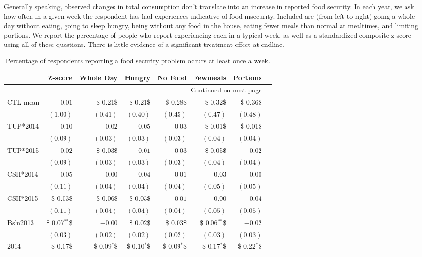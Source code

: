 \documentclass[12pt,article]{article}
\begin{document}
Generally speaking, observed changes in total consumption don't translate into an
increase in reported food security. In each year, we ask how often in a given week
the respondent has had experiences indicative of food insecurity. Included are (from
left to right) going a whole day without eating, going to sleep hungry, being without
any food in the house, eating fewer meals than normal at mealtimes, and limiting
portions. We report the percentage of people who report experiencing each in a
typical week, as well as a standardized composite z-score using all of these
questions. There is little evidence of a significant treatment effect at endline.

\begin{longtable}{lrrrrrrr}
\caption{\label{tab:foodsecure}Percentage of respondents reporting a food security problem occurs at least once a week.}
\\
\hline
 & Z-score & Whole Day & Hungry & No Food & Fewmeals & Portions\\
\hline
\endhead
\hline\multicolumn{7}{r}{Continued on next page} \\
\endfoot
\endlastfoot
CTL mean & $-0.01$ & \$ 0.21\$ & \$ 0.21\$ & \$ 0.28\$ & \$ 0.32\$ & \$ 0.36\$\\
 & $( 1.00)$ & $( 0.41)$ & $( 0.40)$ & $( 0.45)$ & $( 0.47)$ & $( 0.48)$\\
\hline
TUP*2014 & $-0.10$ & $-0.02$ & $-0.05$ & $-0.03$ & \$ 0.01\$ & \$ 0.01\$\\
 & $( 0.09)$ & $( 0.03)$ & $( 0.03)$ & $( 0.03)$ & $( 0.04)$ & $( 0.04)$\\
TUP*2015 & $-0.02$ & \$ 0.03\$ & $-0.01$ & $-0.03$ & \$ 0.05\$ & $-0.02$\\
 & $( 0.09)$ & $( 0.03)$ & $( 0.03)$ & $( 0.03)$ & $( 0.04)$ & $( 0.04)$\\
CSH*2014 & $-0.05$ & $-0.00$ & $-0.04$ & $-0.01$ & $-0.03$ & $-0.00$\\
 & $( 0.11)$ & $( 0.04)$ & $( 0.04)$ & $( 0.04)$ & $( 0.05)$ & $( 0.05)$\\
CSH*2015 & \$ 0.03\$ & \$ 0.06\$ & \$ 0.03\$ & $-0.01$ & $-0.00$ & $-0.04$\\
 & $( 0.11)$ & $( 0.04)$ & $( 0.04)$ & $( 0.04)$ & $( 0.05)$ & $( 0.05)$\\
Bsln2013 & \$ 0.07$^{\text{**}}$\$ & $-0.00$ & \$ 0.02\$ & \$ 0.03\$ & \$ 0.06$^{\text{**}}$\$ & $-0.02$\\
 & $( 0.03)$ & $( 0.02)$ & $( 0.02)$ & $( 0.02)$ & $( 0.03)$ & $( 0.03)$\\
2014 & \$ 0.07\$ & \$ 0.09$^{\textbf{*}}$\$ & \$ 0.10$^{\textbf{*}}$\$ & \$ 0.09$^{\textbf{*}}$\$ & \$ 0.17$^{\textbf{*}}$\$ & \$ 0.22$^{\textbf{*}}$\$\\

\end{longtable}
\end{document}

